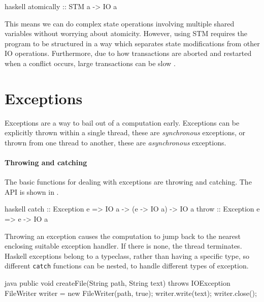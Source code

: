 \begin{listing}
\centering
\begin{cminted}{haskell}
atomically :: STM a -> IO a
\end{cminted}
\caption{Executing transactions in Haskell.}\label{lst:atomically_haskell}
\end{listing}

This means we can do complex state operations involving multiple
shared variables without worrying about atomicity.  However, using STM
requires the program to be structured in a way which separates state
modifications from other IO operations.  Furthermore, due to how
transactions are aborted and restarted when a conflict occurs, large
transactions can be slow \parencite{le2015}.

\section{Exceptions}
\label{sec:concurrent_haskell-exc}

Exceptions are a way to bail out of a computation early.  Exceptions can be
explicitly thrown within a single thread, these are \emph{synchronous}
exceptions, or thrown from one thread to another, these are \emph{asynchronous}
exceptions.

\paragraph{Throwing and catching}
The basic functions for dealing with exceptions are throwing and
catching.  The API is shown in .

\begin{listing}
\centering
\begin{cminted}{haskell}
catch :: Exception e => IO a -> (e -> IO a) -> IO a
throw :: Exception e => e -> IO a
\end{cminted}
\caption{Exceptions in Haskell.}\label{lst:excs_haskell}
\end{listing}

Throwing an exception causes the computation to jump back to the
nearest enclosing suitable exception handler.  If there is none, the
thread terminates.  Haskell exceptions belong to a typeclass, rather
than having a specific type, so different \verb|catch| functions can
be nested, to handle different types of exception.

\begin{listing}
\centering
\begin{cminted}{java}
public void createFile(String path, String text) throws IOException {
  FileWriter writer = new FileWriter(path, true);
  writer.write(text);
  writer.close();
}
\end{cminted}
\caption{Checked exceptions in Java.}\label{lst:excs_java}
\end{listing}


